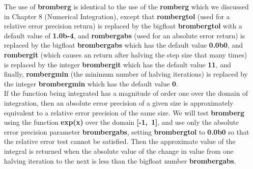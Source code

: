 \documentclass[12pt]{article}
\begin{document}
\noindent The use of \textbf{bromberg} is identical to the use of the
 \textbf{romberg} which we discussed in Chapter 8 (Numerical Integration),
  except that \textbf{rombergtol} (used for a relative error precision return) is
  replaced by the bigfloat \textbf{brombergtol} with a default value of \textbf{1.0b-4}, and
  \textbf{rombergabs} (used for an absolute error return) is replaced by the bigfloat \textbf{brombergabs}
  which has the default value \textbf{0.0b0}, and \textbf{rombergit} (which causes
  an return after halving the step size that many times) is replaced by the integer
  \textbf{brombergit} which has the default value \textbf{11}, and finally,
  \textbf{rombergmin} (the minimum number of halving iterations)  is replaced by the
   integer  \textbf{brombergmin} which has the default value \textbf{0}.\\
  
\noindent If the function being integrated has a magnitude of order one over the domain
   of integration, then an absolute error precision of a given size is approximately 
   equivalent to a relative error precision of the same size.
We will test \textbf{bromberg} using the function \textbf{exp(x)} over the domain
  \textbf{[-1,\, 1]}, and use only the absolute error precision parameter \textbf{brombergabs},
  setting \textbf{brombergtol} to \textbf{0.0b0} so that the relative error test cannot
  be satisfied.  
Then the approximate value of the integral is returned when the absolute value
  of the change in value from one halving iteration to the next is less than the bigfloat
  number \textbf{brombergabs}.\\  
  
\end{document}

